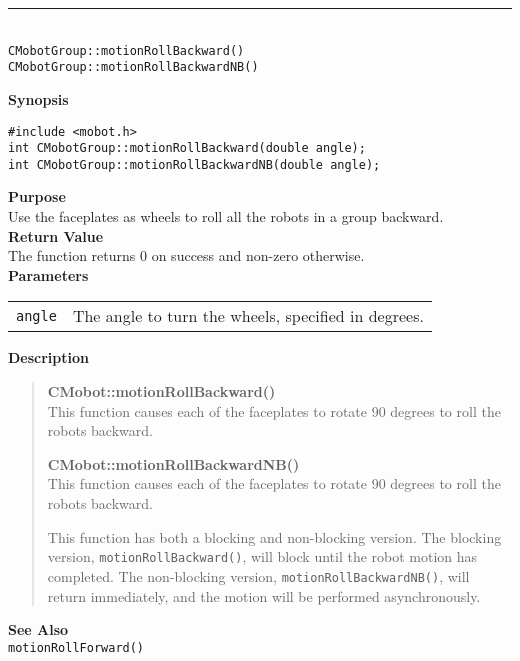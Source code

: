 \noindent
\vspace{5pt}
\rule{4.5in}{0.015in}\\
\noindent
{\LARGE \texttt{CMobotGroup::motionRollBackward()}}\\
{\LARGE \texttt{CMobotGroup::motionRollBackwardNB()}}\\
{}

\noindent
{\bf Synopsis}
\vspace{-8pt}
\begin{verbatim}
#include <mobot.h>
int CMobotGroup::motionRollBackward(double angle);
int CMobotGroup::motionRollBackwardNB(double angle);
\end{verbatim}

\noindent
{\bf Purpose}\\
Use the faceplates as wheels to roll all the robots in a group backward.\\

\noindent
{\bf Return Value}\\
The function returns 0 on success and non-zero otherwise.\\

\noindent
{\bf Parameters}\\
\vspace{-0.1in}
\begin{description}
\item               
\begin{tabular}{p{15 mm}p{145 mm}}
\texttt{angle} & The angle to turn the wheels, specified in degrees.\\
\end{tabular}
\end{description}

\noindent
{\bf Description}\\
\vspace{-12pt}
\begin{quote}
{\bf CMobot::motionRollBackward()}\\
This function causes each of the faceplates to rotate 90 degrees to roll the
robots backward.

{\bf CMobot::motionRollBackwardNB()}\\
This function causes each of the faceplates to rotate 90 degrees to roll the
robots backward.

This function has both a blocking and non-blocking version.
The blocking version, \texttt{motionRollBackward()}, will block until the
robot motion has completed. The non-blocking version, \texttt{motionRollBackwardNB()},
will return immediately, and the motion will be performed asynchronously.\\
\end{quote}

\noindent
{\bf See Also}\\
\texttt{motionRollForward()}

